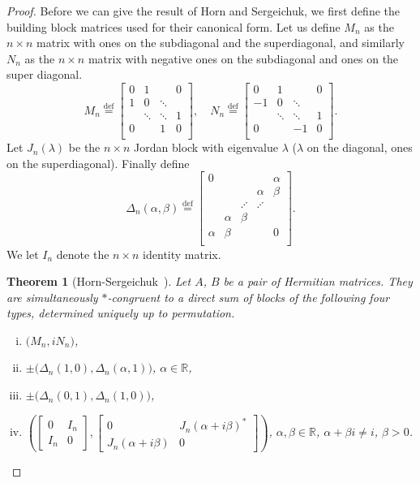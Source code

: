 \documentclass[12pt,openany]{book}
\newcommand{\R}{{\mathbb{R}}}
\theoremstyle{plain}
\newtheorem{thm}{Theorem}[section]
\theoremstyle{remark}
\theoremstyle{definition}
\theoremstyle{exercise}
\theoremstyle{example}
\begin{document}
\begin{proof}
Before we can give the result of Horn and Sergeichuk, we first define
the building block matrices used for their canonical form.
Let us define $M_n$ as the $n \times n$ matrix with ones on the subdiagonal
and the superdiagonal, and similarly
$N_n$ as the $n \times n$ matrix with negative ones on the subdiagonal
and ones on the super diagonal.
\begin{equation}
M_n \overset{\text{def}}{=}
\begin{bmatrix}
0 & 1 & & 0 \\
1 & 0 & \ddots &  \\
& \ddots & \ddots & 1 \\
0 & & 1 & 0 \\
\end{bmatrix}
, \quad
N_n \overset{\text{def}}{=}
\begin{bmatrix}
0 & 1 & & 0 \\
-1 & 0 & \ddots &  \\
& \ddots & \ddots & 1 \\
0 & & -1 & 0 \\
\end{bmatrix} .
\end{equation}
Let $J_n(\lambda)$ be the $n \times n$ Jordan block with eigenvalue $\lambda$
($\lambda$ on the diagonal, ones on the superdiagonal).  Finally define
\begin{equation}
\Delta_n(\alpha,\beta) \overset{\text{def}}{=} 
\begin{bmatrix}
0 & & & & \alpha \\
& & & \alpha & \beta \\
& & \iddots & \iddots & \\
& \alpha & \beta & & \\
\alpha & \beta & & & 0 \\
\end{bmatrix} .
\end{equation}
We let $I_n$ denote the $n \times n$ identity matrix.

\begin{thm}[Horn-Sergeichuk~\cite{HornSergeichuk}]
Let $A$, $B$ be a pair of Hermitian matrices.  They are simultaneously
$*$-congruent to a direct sum of blocks of the following four types,
determined uniquely up to permutation.
\begin{enumerate}[(i)]
\item $\bigl( M_n, iN_n \bigr)$,
\item $\pm \bigl( \Delta_n(1,0),\Delta_n(\alpha,1) \bigr)$, $\alpha \in \R$,
\item $\pm \bigl( \Delta_n(0,1),\Delta_n(1,0) \bigr)$,
\item $\left(
\begin{bmatrix}
0 & I_n \\
I_n & 0
\end{bmatrix} ,
\begin{bmatrix}
0 & J_n(\alpha+i\beta)^* \\
J_n(\alpha+i\beta) & 0
\end{bmatrix}
\right)$, $\alpha,\beta \in \R$, $\alpha+\beta i \not=i$, $\beta > 0$.
\end{enumerate}
\end{thm}


\end{proof}
\end{document}
